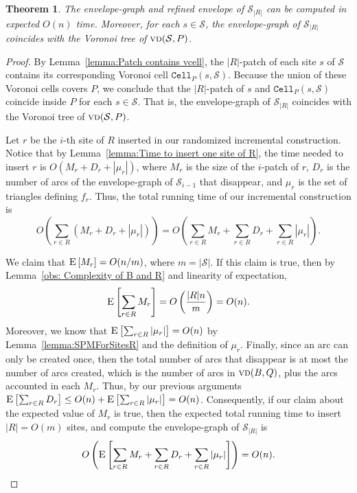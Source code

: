 \documentclass[a4paper, 11pt]{article}
\newtheorem{theorem}{Theorem}[section]
\newcommand{\icell}[1][i]{${#1}$-patch\xspace}
\newcommand{\s}{\mathcal S}
\newcommand{\cell}[2][P]{\ensuremath{\mathtt{Cell}_{\scriptscriptstyle #1}(#2)}}
\newcommand{\vd}[2][P]{\textsc{vd}(#2, #1)}
\newcommand{\ex}[1]{\textsc{E}\left[#1\right]}
\begin{document}
\begin{theorem}
The envelope-graph and refined envelope of $\s_{|R|}$ can be computed in expected $O(n)$ time.
Moreover, for each $s\in \s$, the envelope-graph of $\s_{|R|}$ coincides with the Voronoi tree of $\vd{\s}$.
\end{theorem}
\begin{proof}
By Lemma~\ref{lemma:Patch contains vcell}, the \icell[|R|] of each site $s$ of $\s$ contains its corresponding Voronoi cell $\cell{s, \s}$. 
Because the union of these Voronoi cells covers $P$, we conclude that the \icell[|R|] of $s$ and $\cell{s, \s}$ coincide inside $P$ for each $s\in \s$.
That is, the envelope-graph of $\s_{|R|}$ coincides with the Voronoi tree of $\vd{\s}$.

Let $r$ be the $i$-th site of $R$ inserted in our randomized incremental construction. 
Notice that by Lemma~\ref{lemma:Time to insert one site of R}, 
the time needed to insert $r$ is $O(M_r + D_r + |\mu_r|)$, where $M_r$ is the size of the \icell of $r$, $D_r$ is the number of arcs of the envelope-graph of $\s_{i-1}$ that disappear, and $\mu_r$ is the set of triangles defining $f_r$. 
Thus, the total running time of our incremental construction is 
\[ O\left(\sum_{r\in R} (M_r + D_r + |\mu_r|) \right ) = O\left( \sum_{r\in R} M_r + \sum_{r\in R} D_r + \sum_{r\in R} |\mu_r|\right). \]



We claim that $\ex{M_r} = O(n/m)$, where $m = |\s|$.
If this claim is true, then by Lemma~\ref{obs: Complexity of B and R} and linearity of expectation, 
\[\ex{\sum_{r\in R} M_r} = O\left(\frac{|R| n}{m}\right) =  O(n).\]
Moreover, we know that $\ex{\sum_{r\in R} |\mu_r|} = O(n)$ by Lemma~\ref{lemma:SPMForSitesR} and the definition of $\mu_r$.
Finally, since an arc can only be created once, then the total number of arcs that disappear is at most the number of arcs created, which is the number of arcs in $\vd[Q]{B}$, plus the arcs accounted in each $M_r$. Thus, by our previous arguments $\ex{\sum_{r\in R} D_r}  \leq  O(n) + \ex{\sum_{r\in R} |\mu_r|} = O(n)$.
Consequently, if our claim about the expected value of $M_r$ is true, then the expected total running time to insert $|R| = O(m)$ sites, and compute the envelope-graph of $\s_{|R|}$ is 
\[O\left( \ex{\sum_{r\in R} M_r + \sum_{r\in R} D_r + \sum_{r\in R} |\mu_r|}\right) = O(n).\]


\end{proof}
\end{document}
